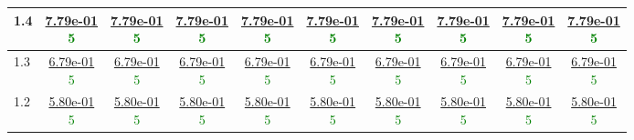 \begin{table}[H]
\begin{tabular}{|l||c|c|c|c|c|c|c|c|c|}
\hline
 1.4 & \makecell{\ul{7.79e-01} \\ \textcolor{Green}{5}} & \makecell{\ul{7.79e-01} \\ \textcolor{Green}{5}} & \makecell{\ul{7.79e-01} \\ \textcolor{Green}{5}} & \makecell{\ul{7.79e-01} \\ \textcolor{Green}{5}} & \makecell{\ul{7.79e-01} \\ \textcolor{Green}{5}} & \makecell{\ul{7.79e-01} \\ \textcolor{Green}{5}} & \makecell{\ul{7.79e-01} \\ \textcolor{Green}{5}} & \makecell{\ul{7.79e-01} \\ \textcolor{Green}{5}} & \makecell{\ul{7.79e-01} \\ \textcolor{Green}{5}} \\
\hline
 1.3 & \makecell{\ul{6.79e-01} \\ \textcolor{Green}{5}} & \makecell{\ul{6.79e-01} \\ \textcolor{Green}{5}} & \makecell{\ul{6.79e-01} \\ \textcolor{Green}{5}} & \makecell{\ul{6.79e-01} \\ \textcolor{Green}{5}} & \makecell{\ul{6.79e-01} \\ \textcolor{Green}{5}} & \makecell{\ul{6.79e-01} \\ \textcolor{Green}{5}} & \makecell{\ul{6.79e-01} \\ \textcolor{Green}{5}} & \makecell{\ul{6.79e-01} \\ \textcolor{Green}{5}} & \makecell{\ul{6.79e-01} \\ \textcolor{Green}{5}} \\
\hline
 1.2 & \makecell{\ul{5.80e-01} \\ \textcolor{Green}{5}} & \makecell{\ul{5.80e-01} \\ \textcolor{Green}{5}} & \makecell{\ul{5.80e-01} \\ \textcolor{Green}{5}} & \makecell{\ul{5.80e-01} \\ \textcolor{Green}{5}} & \makecell{\ul{5.80e-01} \\ \textcolor{Green}{5}} & \makecell{\ul{5.80e-01} \\ \textcolor{Green}{5}} & \makecell{\ul{5.80e-01} \\ \textcolor{Green}{5}} & \makecell{\ul{5.80e-01} \\ \textcolor{Green}{5}} & \makecell{\ul{5.80e-01} \\ \textcolor{Green}{5}} \\

\end{tabular}
\end{table}
